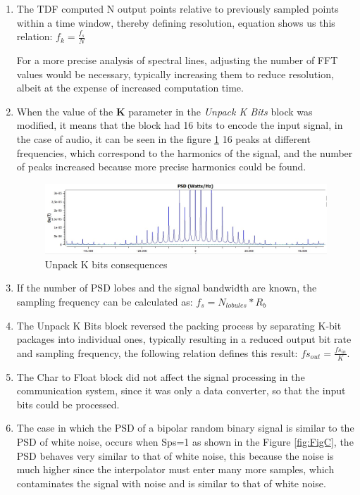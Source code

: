 \documentclass{journal}[IEEEtran, twocolumn]             %
\begin{document}
\begin{multicols}{2}
\begin{enumerate}
    \item The TDF computed N output points relative to previously sampled points within a time window, thereby defining resolution, equation shows us this relation: $f_{k} = \frac{f_{s}}{N}$

    For a more precise analysis of spectral lines, adjusting the number of FFT values would be necessary, typically increasing them to reduce resolution, albeit at the expense of increased computation time.

    \item When the value of the \textbf{K} parameter in the \textit{Unpack K Bits} block was modified, it means that the block had 16 bits to encode the input signal, in the case of audio, it can be seen in the figure \ref{fig:kbits} 16 peaks at different frequencies, which correspond to the harmonics of the signal, and the number of peaks increased because more precise harmonics could be found.
    \begin{figure}[H]
    \centering
        \centering
        \includegraphics[width=0.9\columnwidth]{figs/K_bits.jpeg}
    \caption{Unpack K bits consequences}
    \label{fig:kbits}
    \end{figure}

    \item If the number of PSD lobes and the signal bandwidth are known, the sampling frequency can be calculated as: $f_{s} = N_{lobules} * R_{b}$

    \item The Unpack K Bits block reversed the packing process by separating K-bit packages into individual ones, typically resulting in a reduced output bit rate and sampling frequency, the following relation defines this result:     $fs_{out} = \frac{fs_{in}}{K}$.

    \item The Char to Float block did not affect the signal processing in the communication system, since it was only a data converter, so that the input bits could be processed.

    \item The case in which the PSD of a bipolar random binary signal is similar to the PSD of white noise, occurs when Sps=1 as shown in the Figure \ref{fig:FigC}, the PSD behaves very similar to that of white noise, this because the noise is much higher since the interpolator must enter many more samples, which contaminates the signal with noise and is similar to that of white noise.


\end{enumerate}
\end{multicols}
\end{document}
